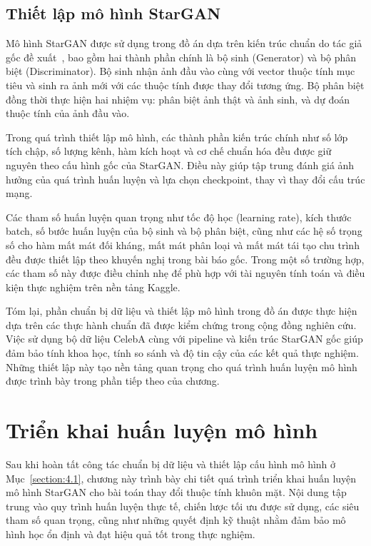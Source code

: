 \documentclass[../DoAn.tex]{subfiles}
\begin{document}
\subsection{Thiết lập mô hình StarGAN}

Mô hình StarGAN được sử dụng trong đồ án dựa trên kiến trúc chuẩn do tác giả gốc đề xuất~\cite{Zhu2018CycleGAN}, bao gồm hai thành phần chính là bộ sinh (Generator) và bộ phân biệt (Discriminator). Bộ sinh nhận ảnh đầu vào cùng với vector thuộc tính mục tiêu và sinh ra ảnh mới với các thuộc tính được thay đổi tương ứng. Bộ phân biệt đồng thời thực hiện hai nhiệm vụ: phân biệt ảnh thật và ảnh sinh, và dự đoán thuộc tính của ảnh đầu vào.

Trong quá trình thiết lập mô hình, các thành phần kiến trúc chính như số lớp tích chập, số lượng kênh, hàm kích hoạt và cơ chế chuẩn hóa đều được giữ nguyên theo cấu hình gốc của StarGAN. Điều này giúp tập trung đánh giá ảnh hưởng của quá trình huấn luyện và lựa chọn checkpoint, thay vì thay đổi cấu trúc mạng.

Các tham số huấn luyện quan trọng như tốc độ học (learning rate), kích thước batch, số bước huấn luyện của bộ sinh và bộ phân biệt, cũng như các hệ số trọng số cho hàm mất mát đối kháng, mất mát phân loại và mất mát tái tạo chu trình đều được thiết lập theo khuyến nghị trong bài báo gốc. Trong một số trường hợp, các tham số này được điều chỉnh nhẹ để phù hợp với tài nguyên tính toán và điều kiện thực nghiệm trên nền tảng Kaggle.


Tóm lại, phần chuẩn bị dữ liệu và thiết lập mô hình trong đồ án được thực hiện dựa trên các thực hành chuẩn đã được kiểm chứng trong cộng đồng nghiên cứu. Việc sử dụng bộ dữ liệu CelebA cùng với pipeline và kiến trúc StarGAN gốc giúp đảm bảo tính khoa học, tính so sánh và độ tin cậy của các kết quả thực nghiệm. Những thiết lập này tạo nền tảng quan trọng cho quá trình huấn luyện mô hình được trình bày trong phần tiếp theo của chương.





\section{Triển khai huấn luyện mô hình}
\label{section:4.2}

Sau khi hoàn tất công tác chuẩn bị dữ liệu và thiết lập cấu hình mô hình ở Mục~\ref{section:4.1}, chương này trình bày chi tiết quá trình triển khai huấn luyện mô hình StarGAN cho bài toán thay đổi thuộc tính khuôn mặt. Nội dung tập trung vào quy trình huấn luyện thực tế, chiến lược tối ưu được sử dụng, các siêu tham số quan trọng, cũng như những quyết định kỹ thuật nhằm đảm bảo mô hình học ổn định và đạt hiệu quả tốt trong thực nghiệm.
\end{document}
